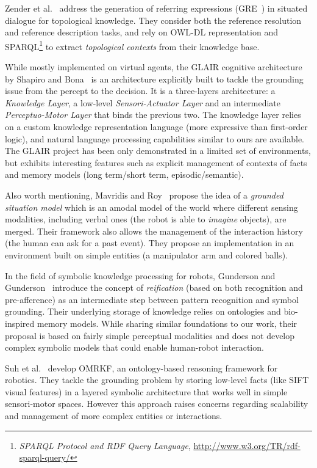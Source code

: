 \documentclass{svmult}
\begin{document}
Zender et al.~\cite{Zender2009} address the generation of referring expressions
(GRE~\cite{Dale1995}) in situated dialogue for topological knowledge.  They consider
both the reference resolution and reference description tasks, and rely on
OWL-DL representation and SPARQL\footnote{{\em SPARQL Protocol and RDF Query
Language}, \url{http://www.w3.org/TR/rdf-sparql-query/}} to extract
\emph{topological contexts} from their knowledge base.

While mostly implemented on virtual agents, the GLAIR cognitive architecture by
Shapiro and Bona~\cite{Shapiro2009} is an architecture explicitly built to
tackle the grounding issue from the percept to the decision. It is a
three-layers architecture: a \emph{Knowledge Layer}, a low-level
\emph{Sensori-Actuator Layer} and an intermediate \emph{Perceptuo-Motor Layer}
that binds the previous two.  The knowledge layer relies on a custom knowledge
representation language (more expressive than first-order logic), and natural
language processing capabilities similar to ours are available. The GLAIR
project has been only demonstrated in a limited set of environments, but
exhibits interesting features such as explicit management of contexts of facts
and memory models (long term/short term, episodic/semantic).

Also worth mentioning, Mavridis and Roy~\cite{Mavridis2005} propose the idea of
a \emph{grounded situation model} which is an amodal model of the world where
different sensing modalities, including verbal ones (the robot is able to
\emph{imagine} objects), are merged. Their framework also allows the management of
the interaction history (the human can ask for a past event). They propose an
implementation in an environment built on simple entities (a manipulator arm
and colored balls).

In the field of symbolic knowledge processing for robots, Gunderson and
Gunderson~\cite{Gunderson2008} introduce the concept of \emph{reification}
(based on both recognition and pre-afference) as an intermediate step between
pattern recognition and symbol grounding. Their underlying storage of knowledge
relies on ontologies and bio-inspired memory models. While sharing similar
foundations to our work, their proposal is based on fairly simple perceptual
modalities and does not develop complex symbolic models that could enable
human-robot interaction.

Suh et al.~\cite{Suh2007} develop {\sc OMRKF}, an ontology-based reasoning
framework for robotics. They tackle the grounding problem by storing low-level
facts (like SIFT visual features) in a layered symbolic architecture that works
well in simple sensori-motor spaces. However this approach raises concerns
regarding scalability and management of more complex entities or interactions.
\end{document}
